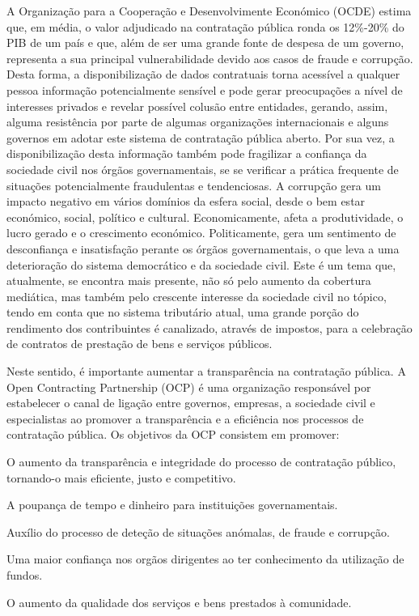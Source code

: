A Organização para a Cooperação e Desenvolvimente Económico (OCDE) estima que, em média, o valor adjudicado na contratação pública ronda os 12\%-20\% do PIB de um país e que, além de ser uma grande fonte de despesa de um governo, representa a sua principal vulnerabilidade devido aos casos de fraude e corrupção\cite{ocp_brief}\cite{redflags_guide}. Desta forma, a disponibilização de dados contratuais torna acessível a qualquer pessoa informação potencialmente sensível e pode gerar preocupações a nível de interesses privados e revelar possível colusão entre entidades, gerando, assim, alguma resistência por parte de algumas organizações internacionais e alguns governos em adotar este sistema de contratação pública aberto. Por sua vez, a disponibilização desta informação também pode fragilizar a confiança da sociedade civil nos órgãos governamentais, se se verificar a prática frequente de situações potencialmente fraudulentas e tendenciosas\cite{stateogp}.  A corrupção gera um impacto negativo em vários domínios da esfera social, desde o bem estar económico, social, político e cultural. Economicamente, afeta a produtividade, o lucro gerado e o crescimento económico. Politicamente, gera um sentimento de desconfiança e insatisfação perante os órgãos governamentais, o que leva a uma deterioração do sistema democrático e da sociedade civil. Este é um tema que, atualmente, se encontra mais presente, não só pelo aumento da cobertura mediática, mas também pelo crescente interesse da sociedade civil no tópico\cite{crime}, tendo em conta que no sistema tributário atual, uma grande porção do rendimento dos contribuintes é canalizado, através de impostos, para a celebração de contratos de prestação de bens e serviços públicos. 

Neste sentido, é importante aumentar a transparência na contratação pública. A Open Contracting Partnership (OCP) é uma organização responsável por estabelecer o canal de ligação entre governos, empresas, a sociedade civil e especialistas ao promover a transparência e a eficiência nos processos de contratação pública. Os objetivos da OCP consistem em promover\cite{redflags_guide}\cite{stateogp}:

\begin{my_itemize}
	
	\item O aumento da transparência e integridade do processo de contratação público, tornando-o mais eficiente, justo e competitivo.
	
	\item A poupança de tempo e dinheiro para instituições governamentais.
	
	\item Auxílio do processo de deteção de situações anómalas, de fraude e corrupção.
	
	\item Uma maior confiança nos orgãos dirigentes ao ter conhecimento da utilização de fundos.
	
	\item O aumento da qualidade dos serviços e bens prestados à comunidade.
	
\end{my_itemize}


